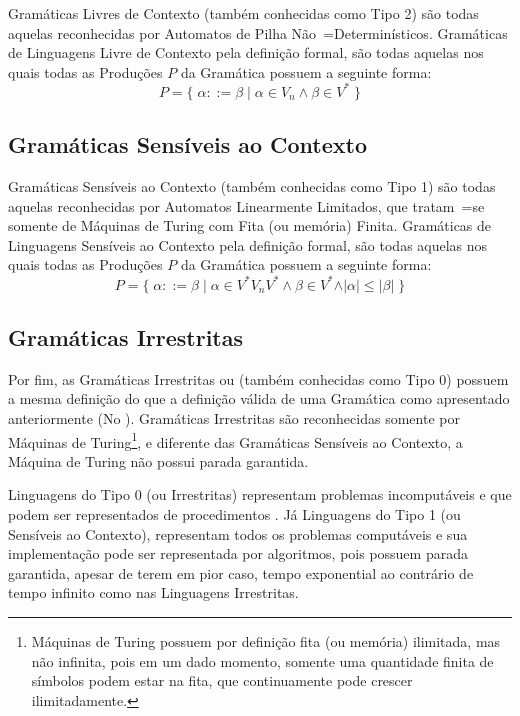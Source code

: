 {    Gramáticas Livres de Contexto (também conhecidas como Tipo 2) \cite{hopcroftBook} são todas aquelas reconhecidas por Automatos de Pilha Não~=Determinísticos.
    Gramáticas de Linguagens Livre de Contexto pela definição formal,
    são todas aquelas nos quais todas as Produções $P$ da Gramática possuem a seguinte forma:
    $$ P = \{\; \alpha ::= \beta \;|\; \alpha \in V_n \land \beta \in V^* \;\} $$


\subsection{Gramáticas Sensíveis ao Contexto}

    Gramáticas Sensíveis ao Contexto (também conhecidas como Tipo 1) são todas aquelas reconhecidas por Automatos Linearmente Limitados,
    que tratam~=se somente de Máquinas de Turing \cite{sipserBook} com Fita (ou memória) Finita.
    Gramáticas de Linguagens Sensíveis ao Contexto pela definição formal,
    são todas aquelas nos quais todas as Produções $P$ da Gramática possuem a seguinte forma:
    $$ P = \{\; \alpha ::= \beta \;|\; \alpha \in V^* V_n V^* \land \beta \in V^*
                \land \vert\alpha\vert \leq \vert\beta\vert \;\} $$


\subsection{Gramáticas Irrestritas}

    Por fim,
    as Gramáticas Irrestritas ou (também conhecidas como Tipo 0) possuem a mesma definição do
    que a definição válida de uma Gramática como apresentado anteriormente (No
    ).
    Gramáticas Irrestritas são reconhecidas somente por Máquinas de Turing\footnote{
    Máquinas de Turing possuem por definição fita (ou memória) ilimitada,
    mas não infinita,
    pois em um dado momento,
    somente uma quantidade finita de símbolos podem estar na fita,
    que continuamente pode crescer ilimitadamente.
    },
    e diferente das Gramáticas Sensíveis ao Contexto,
    a Máquina de Turing não possui parada garantida.

    Linguagens do Tipo 0 (ou Irrestritas) representam problemas incomputáveis e
    que podem ser representados de procedimentos \cite{sipserBook}.
    Já Linguagens do Tipo 1 (ou Sensíveis ao Contexto),
    representam todos os problemas computáveis e
    sua implementação pode ser representada por algoritmos,
    pois possuem parada garantida,
    apesar de terem em pior caso,
    tempo exponential ao contrário de tempo infinito como nas Linguagens Irrestritas.


}

